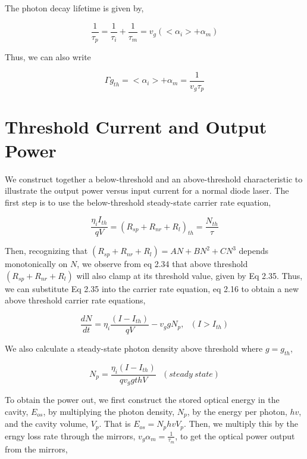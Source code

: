 The photon decay lifetime is given by,

\begin{equation}
  \frac{1}{\tau_p} = \frac{1}{\tau_i} + \frac{1}{\tau_m} = v_g(<\alpha_i> + \alpha_m)
\end{equation}

Thus, we can also write

\begin{equation}
  \Gamma g_{th} = <\alpha_i> + \alpha_m = \frac{1}{v_g\tau_p}
\end{equation}

\section{Threshold Current and Output Power}
\label{sec:threshold_current_and_power_out_versus_current}

We construct together a below-threshold and an above-threshold characteristic
to illustrate the output power versus input current for a normal diode laser.
The first step is to use the below-threshold steady-state carrier rate
equation,

\begin{equation}
  \frac{\eta_{i}I_{th}}{qV} = {(R_{sp} + R_{nr} + R_{l})}_{th} = \frac{N_{th}}{\tau} 
\end{equation}

Then, recognizing that $(R_{sp} + R_{nr} + R_{l}) =AN + BN^2 +CN^3$ depends
monotonically on $N$, we observe from eq 2.34 that above threshold $(R_{sp} +
R_{nr} + R_{l})$ will also clamp at its threshold value, given by Eq 2.35. Thus,
we can substitute Eq 2.35 into the carrier rate equation, eq 2.16 to obtain a
new above threshold carrier rate equations,

\begin{equation}
  \frac{dN}{dt} = \eta_i \frac{(I - I_{th})}{qV} - v_{g}gN_p,~~~   (I > I_{th})
\end{equation}

We also calculate a steady-state photon density above threshold where $g = g_{th}$,

\begin{equation}
  N_p = \frac{\eta_i (I - I_{th})}{qv_{g}g{th}V}~~~   (steady~ state)
\end{equation}

To obtain the power out, we first construct the stored optical energy in the
cavity, $E_{os}$, by multiplying the photon density, $N_p$, by the energy per
photon, $hv$, and the cavity volume, $V_p$. That is $E_{os} = N_phvV_p$. Then,
we multiply this by the erngy loss rate through the mirrors, $v_g\alpha_m =
\frac{1}{\tau_m}$, to get the optical power output from the mirrors,

